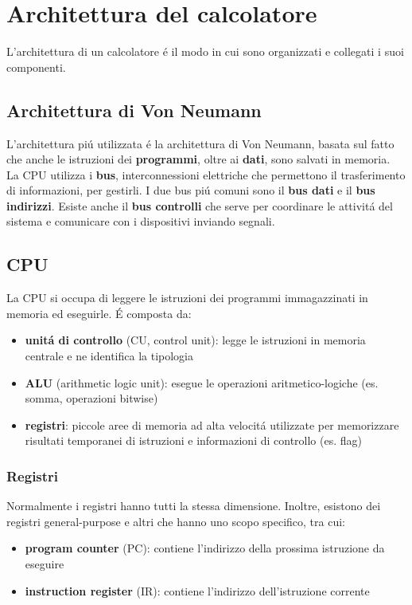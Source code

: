 \documentclass{article}
\begin{document}
\section{Architettura del calcolatore}
L'architettura di un calcolatore é il modo in cui sono organizzati e collegati i suoi componenti.

\subsection{Architettura di Von Neumann}
L'architettura piú utilizzata é la architettura di Von Neumann, basata sul fatto che anche le istruzioni dei \textbf{programmi}, oltre ai \textbf{dati}, sono salvati in memoria.\\
La CPU utilizza i \textbf{bus}, interconnessioni elettriche che permettono il trasferimento di informazioni, per gestirli. I due bus piú comuni sono il \textbf{bus dati} e il \textbf{bus indirizzi}. Esiste anche il \textbf{bus controlli} che serve per coordinare le attivitá del sistema e comunicare con i dispositivi inviando segnali.

\subsection{CPU}
La CPU si occupa di leggere le istruzioni dei programmi immagazzinati in memoria ed eseguirle. É composta da:
\begin{itemize}
	\item \textbf{unitá di controllo} (CU, control unit): legge le istruzioni in memoria centrale e ne identifica la tipologia
	\item \textbf{ALU} (arithmetic logic unit): esegue le operazioni aritmetico-logiche (es. somma, operazioni bitwise)
	\item \textbf{registri}: piccole aree di memoria ad alta velocitá utilizzate per memorizzare risultati temporanei di istruzioni e informazioni di controllo (es. flag)
\end{itemize}

\subsubsection{Registri}
Normalmente i registri hanno tutti la stessa dimensione. Inoltre, esistono dei registri general-purpose e altri che hanno uno scopo specifico, tra cui:
\begin{itemize}
	\item \textbf{program counter} (PC): contiene l'indirizzo della prossima istruzione da eseguire
	\item \textbf{instruction register} (IR): contiene l'indirizzo dell'istruzione corrente
\end{itemize}
\end{document}
